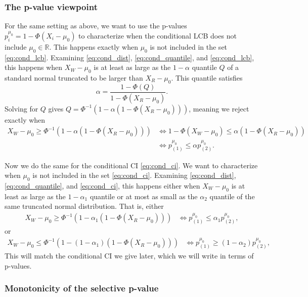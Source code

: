 \documentclass{article}
\newcommand{\R}{\mathbb{R}}
\begin{document}
\begin{appendix}
\subsubsection{The p-value viewpoint }

For the same setting as above, we want to use the p-values $p^{\mu_0}_i = 1 - \Phi(X_i - \mu_0)$ to characterize when the conditional LCB does not include $\mu_0 \in \R$. This happens exactly when $\mu_0$ is not included in the set \eqref{eq:cond_lcb}. Examining \eqref{eq:cond_dist}, \eqref{eq:cond_quantile}, and \eqref{eq:cond_lcb}, this happens when $X_W - \mu_0$ is at least as large as the $1-\alpha$ quantile $Q$ of a standard normal truncated to be larger than $X_R - \mu_0$. This quantile satisfies 
    \begin{equation*}
        \alpha = \frac{1 - \Phi(Q) }{1 - \Phi(X_R - \mu_0) }.
    \end{equation*}
Solving for $Q$ gives $Q = \Phi^{-1}(1 - \alpha(1 - \Phi(X_R - \mu_0)))$, meaning we reject exactly when 
\begin{align*}
    X_{W} - \mu_0 \geq \Phi^{-1}(1 - \alpha(1 - \Phi(X_{R} - \mu_0))) &\iff 1 - \Phi(X_{W} - \mu_0) \leq \alpha(1 - \Phi(X_{R} - \mu_0))\\
    &\iff p^{\mu_0}_{(1)} \leq \alpha p^{\mu_0}_{(2)}.
\end{align*}

Now we do the same for the conditional CI \eqref{eq:cond_ci}. We want to characterize when $\mu_0$ is not included in the set \eqref{eq:cond_ci}. Examining \eqref{eq:cond_dist}, \eqref{eq:cond_quantile}, and \eqref{eq:cond_ci}, this happens either when $X_W - \mu_0$ is at least as large as the $1-\alpha_1$ quantile or at most as small as the $\alpha_2$ quantile of the same truncated normal distribution. That is, either 
\begin{align*}
    X_{W} - \mu_0 \geq \Phi^{-1}(1 - \alpha_1(1 - \Phi(X_{R} - \mu_0))) & \iff p^{\mu_0}_{(1)} \leq \alpha_1 p^{\mu_0}_{(2)},
\end{align*}
or 
\begin{align*}
    X_{W} - \mu_0 \leq \Phi^{-1}(1 - (1-\alpha_1)(1 - \Phi(X_{R} - \mu_0))) & \iff p^{\mu_0}_{(1)} \geq (1-\alpha_2) p^{\mu_0}_{(2)},
\end{align*}
This will match the conditional CI we give later, which we will write in terms of p-values.

\subsubsection{Monotonicity of the selective p-value}


\end{appendix}
\end{document}

